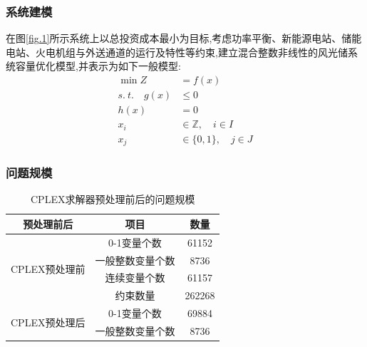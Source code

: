 \documentclass{beamer}
\begin{document}
\begin{frame}
	\frametitle{系统建模} 
	\qquad 在图\ref*{fig.1}所示系统上以总投资成本最小为目标,考虑功率平衡、新能源电站、储能电站、火电机组与外送通道的运行及特性等约束,建立混合整数非线性的风光储系统容量优化模型,并表示为如下一般模型:
	\begin{align}
		\min Z&=f(x)\label{eq.1}\\
		s.\ t. \quad g(x) &\leq 0 \label{eq.2}\\
		h(x)&=0 \label{eq.3}\\
		x_i &\in \mathbb{Z},\quad  i \in I \label{eq.4}\\
		x_j &\in \{0,1\}, \quad j \in J \label{eq.5}
	\end{align}
\end{frame}

\begin{frame}
	\frametitle{问题规模}
	\begin{table}[htbp]
		\centering
		\caption{CPLEX求解器预处理前后的问题规模}
		\label{tab.1}
		\begin{tabular}{|c|c|c|}
		\hline
		预处理前后 & 项目 & 数量  \\ \hline
		\multirow{4}{*}{CPLEX预处理前}	& 0-1变量个数  		& 61152  \\ \cline{2-3} 
										& 一般整数变量个数 	& 8736   \\ \cline{2-3} 
								   		& 连续变量个数   	& 61157  \\ \cline{2-3} 
								   		& 约束数量			& 262268 \\ \hline
		\multirow{2}{*}{CPLEX预处理后} 	& 0-1变量个数		& 69884  \\ \cline{2-3} 
								   		& 一般整数变量个数 	& 8736   \\ \hline
		\end{tabular}
	\end{table}
\end{frame}
\end{document}
